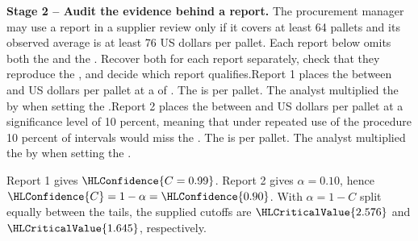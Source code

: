 \textbf{Stage 2 -- Audit the evidence behind a report.} The procurement manager may use a report in a supplier review only if it covers at least 64 pallets and its observed average is at least 76 US dollars per pallet. Each report below omits both the   and the  . Recover both for each report separately, check that they reproduce the , and decide which report qualifies.\newline Report 1 places the  between  and  US dollars per pallet at a  of . The   is  per pallet. The analyst multiplied the   by  when setting the   .\newline Report 2 places the  between  and  US dollars per pallet at a significance level of 10 percent, meaning that under repeated use of the procedure 10 percent of intervals would miss the . The   is  per pallet. The analyst multiplied the   by  when setting the   .
\par\endgroup

Report 1 gives $\HLConfidence{C=0.99}$. Report 2 gives $\alpha=0.10$, hence $\HLConfidence{C}=1-\alpha=\HLConfidence{0.90}$. With $\alpha=1-C$ split equally between the tails, the supplied cutoffs are $\HLCriticalValue{2.576}$ and $\HLCriticalValue{1.645}$, respectively.

